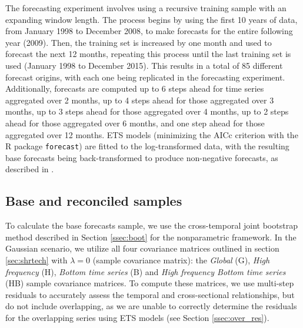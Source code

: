 \documentclass[a4paper,11pt]{article}
\theoremstyle{definition}
\begin{document}
The forecasting experiment involves using a recursive training sample with an expanding window length. The process begins by using the first 10 years of data, from January 1998 to December 2008, to make forecasts for the entire following year (2009). Then, the training set is increased by one month and used to forecast the next 12 months, repeating this process until the last training set is used (January 1998 to December 2015). This results in a total of 85 different forecast origins, with each one being replicated in the forecasting experiment. Additionally, forecasts are computed up to 6 steps ahead for time series aggregated over 2 months, up to 4 steps ahead for those aggregated over 3 months, up to 3 steps ahead for those aggregated over 4 months, up to 2 steps ahead for those aggregated over 6 months, and one step ahead for those aggregated over 12 months. ETS models (minimizing the AICc criterion with the \textsf{R} package \texttt{forecast}) are fitted to the log-transformed data, with the resulting base forecasts being back-transformed to produce non-negative forecasts, as described in \cite{wickramasuriya2020}.

\subsection{Base and reconciled samples}\label{ssec:vn_br}

To calculate the base forecasts sample, we use the cross-temporal joint bootstrap method described in Section \ref{ssec:boot} for the nonparametric framework. In the Gaussian scenario, we utilize all four covariance matrices outlined in section \ref{sec:shrtech} with $\lambda=0$ (sample covariance matrix): the \textit{Global} (G), \textit{High frequency} (H), \textit{Bottom time series} (B) and \textit{High frequency Bottom time series} (HB) sample covariance matrices. To compute these matrices, we use multi-step residuals to accurately assess the temporal and cross-sectional relationships, but do not include overlapping, as we are unable to correctly determine the residuals for the overlapping series using ETS models (see Section \ref{ssec:over_res}).
\end{document}
